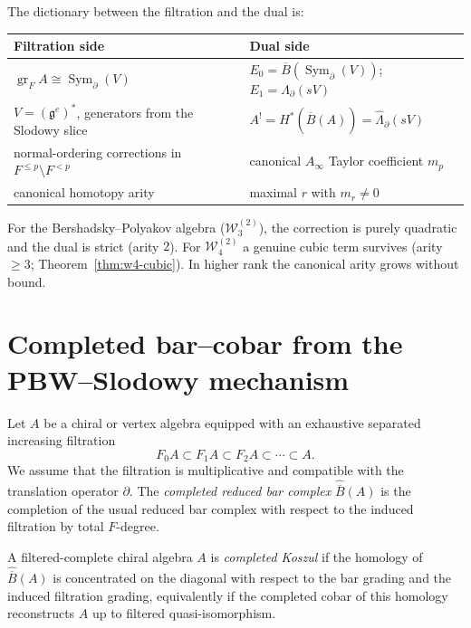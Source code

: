 The dictionary between the filtration and the dual is:
\begin{center}
\renewcommand{\arraystretch}{1.2}
\begin{tabular}{ll}
\textbf{Filtration side} & \textbf{Dual side} \\
\hline
$\operatorname{gr}_F A \cong \operatorname{Sym}_\partial(V)$ &
  $E_0 = \overline{B}(\operatorname{Sym}_\partial(V))$;\;
  $E_1 = \Lambda_\partial(sV)$ \\
$V = (\mathfrak{g}^e)^*$, generators from the Slodowy slice &
  $A^! = H^*(\widehat{\overline{B}}(A)) = \widehat{\Lambda}_\partial(sV)$ \\
normal-ordering corrections in $F^{\leq p} \setminus F^{<p}$ &
  canonical $A_\infty$ Taylor coefficient $m_p$ \\
canonical homotopy arity &
  maximal $r$ with $m_r \neq 0$
\end{tabular}
\end{center}
\noindent
For the Bershadsky--Polyakov algebra ($\mathcal{W}_3^{(2)}$), the
correction is purely quadratic and the dual is strict (arity $2$).
For $\mathcal{W}_4^{(2)}$ a genuine cubic term survives (arity $\geq 3$;
Theorem~\ref{thm:w4-cubic}).
In higher rank the canonical arity grows without bound.

\section{Completed bar--cobar from the PBW--Slodowy mechanism}

\begin{definition}
Let $A$ be a chiral or vertex algebra equipped with an exhaustive separated
increasing filtration
\[
F_0A \subset F_1A \subset F_2A \subset \cdots \subset A.
\]
We assume that the filtration is multiplicative and compatible with the
translation operator $\partial$.  The \emph{completed reduced bar complex}
$\widehat{\overline B}(A)$ is the completion of the usual reduced bar complex
with respect to the induced filtration by total $F$-degree.
\end{definition}

\begin{definition}
A filtered-complete chiral algebra $A$ is \emph{completed Koszul} if the
homology of $\widehat{\overline B}(A)$ is concentrated on the diagonal with
respect to the bar grading and the induced filtration grading, equivalently if
the completed cobar of this homology reconstructs $A$ up to filtered
quasi-isomorphism.
\end{definition}

